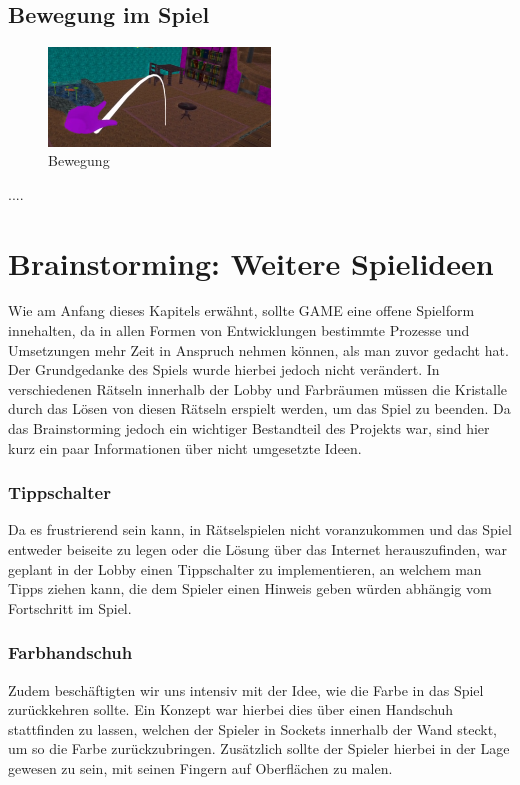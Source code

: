 \subsection{Bewegung im Spiel}
\begin{figure}
	\vspace*{-0.5cm}
	\includegraphics[width=5.9cm]{Pictures/Bewegung}
	\caption{Bewegung}
	\vspace*{-0.5cm}
	\label{fig:bewegung}
\end{figure}
....

\section{Brainstorming: Weitere Spielideen}
Wie am Anfang dieses Kapitels erwähnt, sollte GAME eine offene Spielform innehalten, da in allen Formen von Entwicklungen bestimmte Prozesse und Umsetzungen mehr Zeit in Anspruch nehmen können, als man zuvor gedacht hat. Der Grundgedanke des Spiels wurde hierbei jedoch nicht verändert. In verschiedenen Rätseln innerhalb der Lobby und Farbräumen müssen die Kristalle durch das Lösen von diesen Rätseln erspielt werden, um das Spiel zu beenden. Da das Brainstorming jedoch ein wichtiger Bestandteil des Projekts war, sind hier kurz ein paar Informationen über nicht umgesetzte Ideen.
\subsubsection{Tippschalter}
Da es frustrierend sein kann, in Rätselspielen nicht voranzukommen und das Spiel entweder beiseite zu legen oder die Lösung über das Internet herauszufinden, war geplant in der Lobby einen Tippschalter zu implementieren, an welchem man Tipps ziehen kann, die dem Spieler einen Hinweis geben würden abhängig vom Fortschritt im Spiel.
\subsubsection{Farbhandschuh}
Zudem beschäftigten wir uns intensiv mit der Idee, wie die Farbe in das Spiel zurückkehren sollte. Ein Konzept war hierbei dies über einen Handschuh stattfinden zu lassen, welchen der Spieler in Sockets innerhalb der Wand steckt, um so die Farbe zurückzubringen. Zusätzlich sollte der Spieler hierbei in der Lage gewesen zu sein, mit seinen Fingern auf Oberflächen zu malen.
